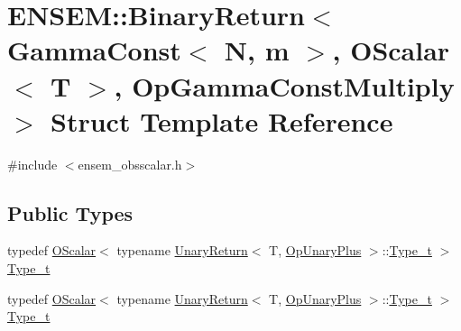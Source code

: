 \hypertarget{structENSEM_1_1BinaryReturn_3_01GammaConst_3_01N_00_01m_01_4_00_01OScalar_3_01T_01_4_00_01OpGammaConstMultiply_01_4}{}\section{E\+N\+S\+EM\+:\+:Binary\+Return$<$ Gamma\+Const$<$ N, m $>$, O\+Scalar$<$ T $>$, Op\+Gamma\+Const\+Multiply $>$ Struct Template Reference}
\label{structENSEM_1_1BinaryReturn_3_01GammaConst_3_01N_00_01m_01_4_00_01OScalar_3_01T_01_4_00_01OpGammaConstMultiply_01_4}


{\ttfamily \#include $<$ensem\+\_\+obsscalar.\+h$>$}

\subsection*{Public Types}
\begin{DoxyCompactItemize}
\item 
typedef \mbox{\hyperlink{classENSEM_1_1OScalar}{O\+Scalar}}$<$ typename \mbox{\hyperlink{structENSEM_1_1UnaryReturn}{Unary\+Return}}$<$ T, \mbox{\hyperlink{structENSEM_1_1OpUnaryPlus}{Op\+Unary\+Plus}} $>$\+::\mbox{\hyperlink{structENSEM_1_1BinaryReturn_3_01GammaConst_3_01N_00_01m_01_4_00_01OScalar_3_01T_01_4_00_01OpGammaConstMultiply_01_4_a193fb1b8c8ec58063f879ac03885c163}{Type\+\_\+t}} $>$ \mbox{\hyperlink{structENSEM_1_1BinaryReturn_3_01GammaConst_3_01N_00_01m_01_4_00_01OScalar_3_01T_01_4_00_01OpGammaConstMultiply_01_4_a193fb1b8c8ec58063f879ac03885c163}{Type\+\_\+t}}
\item 
typedef \mbox{\hyperlink{classENSEM_1_1OScalar}{O\+Scalar}}$<$ typename \mbox{\hyperlink{structENSEM_1_1UnaryReturn}{Unary\+Return}}$<$ T, \mbox{\hyperlink{structENSEM_1_1OpUnaryPlus}{Op\+Unary\+Plus}} $>$\+::\mbox{\hyperlink{structENSEM_1_1BinaryReturn_3_01GammaConst_3_01N_00_01m_01_4_00_01OScalar_3_01T_01_4_00_01OpGammaConstMultiply_01_4_a193fb1b8c8ec58063f879ac03885c163}{Type\+\_\+t}} $>$ \mbox{\hyperlink{structENSEM_1_1BinaryReturn_3_01GammaConst_3_01N_00_01m_01_4_00_01OScalar_3_01T_01_4_00_01OpGammaConstMultiply_01_4_a193fb1b8c8ec58063f879ac03885c163}{Type\+\_\+t}}
\end{DoxyCompactItemize}


